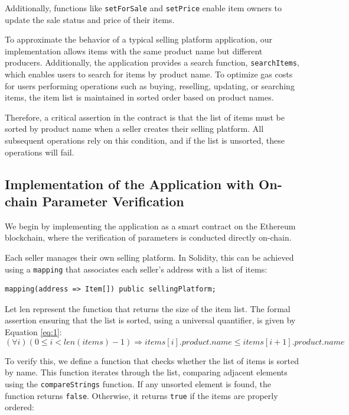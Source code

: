 \documentclass[runningheads]{llncs}
\begin{document}
Additionally, functions like \texttt{setForSale} and \texttt{setPrice} enable item owners to update the sale status and price of their items.

To approximate the behavior of a typical selling platform application, our implementation allows items with the same product name but different producers. Additionally, the application provides a search function, \texttt{searchItems}, which enables users to search for items by product name. To optimize gas costs for users performing operations such as buying, reselling, updating, or searching items, the item list is maintained in sorted order based on product names.

Therefore, a critical assertion in the contract is that the list of items must be sorted by product name when a seller creates their selling platform. All subsequent operations rely on this condition, and if the list is unsorted, these operations will fail.
\subsection{Implementation of the Application with On-chain Parameter Verification}

We begin by implementing the application as a smart contract on the Ethereum blockchain, where the verification of parameters is conducted directly on-chain.

Each seller manages their own selling platform. In Solidity, this can be achieved using a \texttt{mapping} that associates each seller's address with a list of items:

\begin{lstlisting}[numbers=none]
mapping(address => Item[]) public sellingPlatform;
\end{lstlisting}

Let \( \text{len} \) represent the function that returns the size of the item list. The formal assertion ensuring that the list is sorted, using a universal quantifier, is given by Equation \ref{eq:1}:
\[
(\forall i) (0 \leq i < len(items) - 1) \Rightarrow items[i].product.name \leq items[i+1].product.name
\]

\label{eq:sorted_assertion}

To verify this, we define a function that checks whether the list of items is sorted by name. This function iterates through the list, comparing adjacent elements using the \texttt{compareStrings} function. If any unsorted element is found, the function returns \texttt{false}. Otherwise, it returns \texttt{true} if the items are properly ordered:
\end{document}
